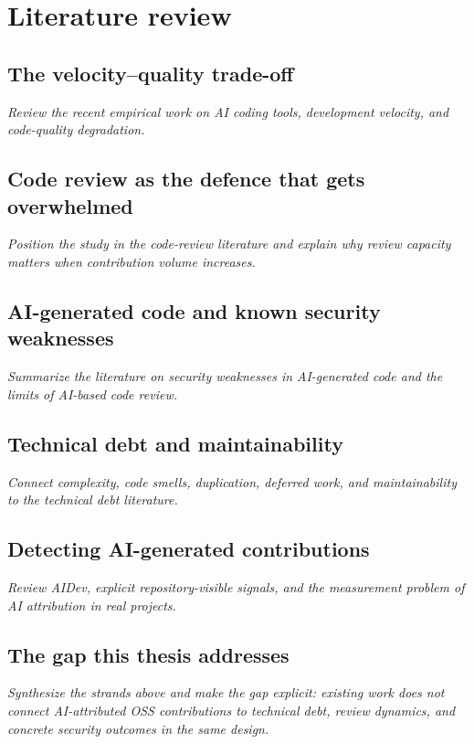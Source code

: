 \chapter{Literature review}
\label{ch:literature}

\section{The velocity--quality trade-off}
\textit{Review the recent empirical work on AI coding tools, development velocity, and code-quality degradation.}

\section{Code review as the defence that gets overwhelmed}
\textit{Position the study in the code-review literature and explain why review capacity matters when contribution volume increases.}

\section{AI-generated code and known security weaknesses}
\textit{Summarize the literature on security weaknesses in AI-generated code and the limits of AI-based code review.}

\section{Technical debt and maintainability}
\textit{Connect complexity, code smells, duplication, deferred work, and maintainability to the technical debt literature.}

\section{Detecting AI-generated contributions}
\textit{Review AIDev, explicit repository-visible signals, and the measurement problem of AI attribution in real projects.}

\section{The gap this thesis addresses}
\textit{Synthesize the strands above and make the gap explicit: existing work does not connect AI-attributed OSS contributions to technical debt, review dynamics, and concrete security outcomes in the same design.}

